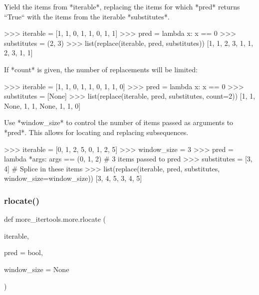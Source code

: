 \begin{DoxyVerb}Yield the items from *iterable*, replacing the items for which *pred*
returns ``True`` with the items from the iterable *substitutes*.

    >>> iterable = [1, 1, 0, 1, 1, 0, 1, 1]
    >>> pred = lambda x: x == 0
    >>> substitutes = (2, 3)
    >>> list(replace(iterable, pred, substitutes))
    [1, 1, 2, 3, 1, 1, 2, 3, 1, 1]

If *count* is given, the number of replacements will be limited:

    >>> iterable = [1, 1, 0, 1, 1, 0, 1, 1, 0]
    >>> pred = lambda x: x == 0
    >>> substitutes = [None]
    >>> list(replace(iterable, pred, substitutes, count=2))
    [1, 1, None, 1, 1, None, 1, 1, 0]

Use *window_size* to control the number of items passed as arguments to
*pred*. This allows for locating and replacing subsequences.

    >>> iterable = [0, 1, 2, 5, 0, 1, 2, 5]
    >>> window_size = 3
    >>> pred = lambda *args: args == (0, 1, 2)  # 3 items passed to pred
    >>> substitutes = [3, 4] # Splice in these items
    >>> list(replace(iterable, pred, substitutes, window_size=window_size))
    [3, 4, 5, 3, 4, 5]\end{DoxyVerb}
 \mbox{\label{namespacemore__itertools_1_1more_abd74b75c503cc19f15331d76960da312}} 
\subsubsection{\texorpdfstring{rlocate()}{rlocate()}}
{\footnotesize\ttfamily def more\+\_\+itertools.\+more.\+rlocate (\begin{DoxyParamCaption}\item[{}]{iterable,  }\item[{}]{pred = {\ttfamily bool},  }\item[{}]{window\+\_\+size = {\ttfamily None} }\end{DoxyParamCaption})}

